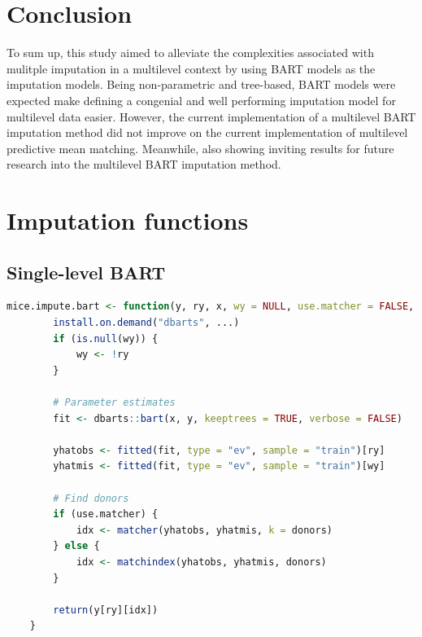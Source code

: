 \documentclass[preprint,12pt]{elsarticle}
\begin{document}
\section{Conclusion}

To sum up, this study aimed to alleviate the complexities associated with mulitple imputation in a multilevel context by using BART models as the imputation models. Being non-parametric and tree-based, BART models were expected make defining a congenial and well performing imputation model for multilevel data easier. However, the current implementation of a multilevel BART imputation method did not improve on the current implementation of multilevel predictive mean matching. Meanwhile, also showing inviting results for future research into the multilevel BART imputation method.

\newpage



\newpage
\appendix
\section{Imputation functions}
\subsection{Single-level BART}
\begin{lstlisting}[language=R, caption = {Imputation function for single-level BART}, label = {lst:singlelevelBART}]
    mice.impute.bart <- function(y, ry, x, wy = NULL, use.matcher = FALSE, donors = 5L, ...) {
        install.on.demand("dbarts", ...)
        if (is.null(wy)) {
            wy <- !ry
        }
    
        # Parameter estimates
        fit <- dbarts::bart(x, y, keeptrees = TRUE, verbose = FALSE)
    
        yhatobs <- fitted(fit, type = "ev", sample = "train")[ry]
        yhatmis <- fitted(fit, type = "ev", sample = "train")[wy]
    
        # Find donors
        if (use.matcher) {
            idx <- matcher(yhatobs, yhatmis, k = donors)
        } else {
            idx <- matchindex(yhatobs, yhatmis, donors)
        }
    
        return(y[ry][idx])
    }
\end{lstlisting}
\end{document}
